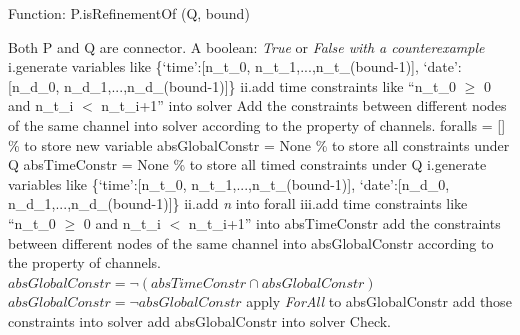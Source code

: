 \documentclass[3p,times]{elsarticle}
\begin{document}
\begin{algorithm}[t]
    \caption{Function: P.isRefinementOf (Q, bound)}
    \begin{algorithmic}[1]
        \REQUIRE Both P and Q are connector.
        \ENSURE A boolean: \emph{True} or \emph{False with a counterexample}
					\STATE i.generate variables like 					
						\newline \{`time':[n\_t\_0, n\_t\_1,...,n\_t\_(bound-1)],				
						\newline `date':[n\_d\_0, n\_d\_1,...,n\_d\_(bound-1)]\}
						\newline
						\newline ii.add time constraints like
						\newline ``n\_t\_0 $\geq$ 0  and  n\_t\_i $<$ n\_t\_i+1''
						\newline into solver
				\ENDIF
			\ENDFOR
		\STATE Add the constraints between different nodes of the same channel into solver according to the property of channels.
        \ENDFOR
        \STATE foralls = []      \% to store new variable
        \STATE absGlobalConstr = None \% to store all constraints under Q
        \STATE absTimeConstr = None \% to store all timed constraints under Q
					\STATE i.generate variables like 					
						\newline \{`time':[n\_t\_0, n\_t\_1,...,n\_t\_(bound-1)],				
						\newline `date':[n\_d\_0, n\_d\_1,...,n\_d\_(bound-1)]\}
						\newline
						\newline ii.add \emph{n} into forall
						\newline
						\newline iii.add time constraints like
						\newline ``n\_t\_0 $\geq$ 0  and  n\_t\_i $<$ n\_t\_i+1''
						\newline into absTimeConstr
				\ENDIF
			\STATE add the constraints between different nodes of the same channel into absGlobalConstr according to the property of channels.
			\ENDFOR
			\STATE $absGlobalConstr = \neg (absTimeConstr \cap absGlobalConstr)  $
		\ELSE
			\STATE $absGlobalConstr = \neg absGlobalConstr$
		\ENDIF
			\STATE apply \emph{ForAll} to absGlobalConstr
			\newline add those constraints into solver
	    \ELSE
	    	\STATE add absGlobalConstr into solver
		\ENDIF	
        \ENDFOR
    \STATE Check.
    \end{algorithmic}
\end{algorithm}
\end{document}
